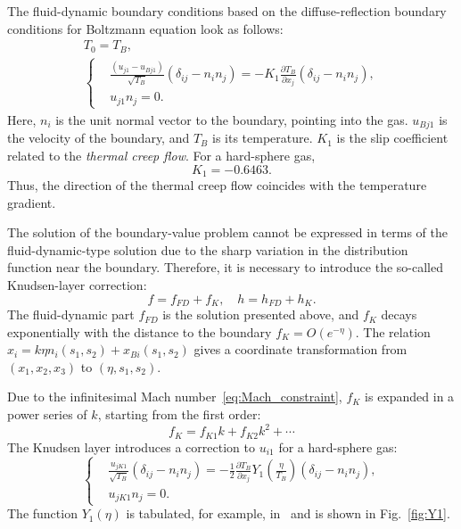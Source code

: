 \documentclass[smallextended, referee]{svjour3} %
\newcommand{\pder}[2][]{\frac{\partial#1}{\partial#2}}
\begin{document}
The fluid-dynamic boundary conditions based on the diffuse-reflection boundary conditions
for Boltzmann equation look as follows:
\begin{gather}
    T_0 = T_B, \label{eq:bound:T} \\
    \left\{
    \begin{aligned}
        & \frac{(u_{j1}-u_{Bj1})}{\sqrt{T_B}}(\delta_{ij}-n_in_j) =
            -K_1\pder[T_B]{x_j}(\delta_{ij}-n_in_j), \\
        & u_{j1}n_j = 0.
    \end{aligned}
    \right. \label{eq:bound:v}
\end{gather}
Here, \(n_i\) is the unit normal vector to the boundary, pointing into the gas.
\(u_{Bj1}\) is the velocity of the boundary, and \(T_B\) is its temperature.
\(K_1\) is the slip coefficient related to the \emph{thermal creep flow}.
For a hard-sphere gas, \[ K_1 = -0.6463. \]
Thus, the direction of the thermal creep flow coincides with the temperature gradient.

The solution of the boundary-value problem cannot be expressed in terms of the fluid-dynamic-type
solution due to the sharp variation in the distribution function near the boundary.
Therefore, it is necessary to introduce the so-called Knudsen-layer correction:
\begin{equation}
    f = f_{FD} + f_K, \quad h = h_{FD} + h_K.
\end{equation}
The fluid-dynamic part \(f_{FD}\) is the solution presented above,
and \(f_K\) decays exponentially with the distance to the boundary \(f_K = O\left(e^{-\eta}\right)\).
The relation \( x_i = k\eta n_i(s_1,s_2) + x_{Bi}(s_1, s_2) \) gives a coordinate transformation
from \((x_1,x_2,x_3)\) to \((\eta,s_1,s_2)\).

Due to the infinitesimal Mach number~\eqref{eq:Mach_constraint}, \(f_K\) is expanded
in a power series of \(k\), starting from the first order:
\[ f_K = f_{K1} k + f_{K2} k ^ 2 + \cdots \]
The Knudsen layer introduces a correction to \(u_{i1}\) for a hard-sphere gas:
\begin{equation}
    \left\{
    \begin{aligned}
        & \frac{u_{jK1}}{\sqrt{T_B}}(\delta_{ij}-n_in_j) =
            -\frac12\pder[T_B]{x_j} Y_1\left(\frac\eta{T_B}\right) (\delta_{ij}-n_in_j), \\
        & u_{jK1}n_j = 0.
    \end{aligned}
    \right. \label{eq:bound:v_K}
\end{equation}
The function \(Y_1(\eta)\) is tabulated, for example, in~\cite{Sone2002, Sone2007} and is shown in Fig.~\ref{fig:Y1}.
\end{document}
